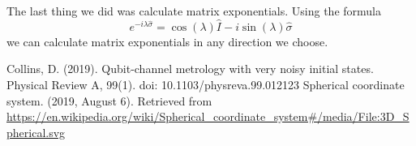 \documentclass[twocolumn]{article}
\begin{document}
The last thing we did was calculate matrix exponentials. Using the formula
\begin{equation}
e^{-i\lambda\hat{\sigma}}=\cos{(\lambda)}\hat{I}-i\sin{(\lambda)}\hat{\sigma}
\end{equation}
we can calculate matrix exponentials in any direction we choose.
\newpage
\begin{thebibliography}{99}
Collins, D. (2019). Qubit-channel metrology with very noisy initial states. Physical Review A, 99(1). doi: 10.1103/physreva.99.012123
Spherical coordinate system. (2019, August 6). Retrieved from \url{https://en.wikipedia.org/wiki/Spherical_coordinate_system#/media/File:3D_Spherical.svg}
\end{thebibliography}
\end{document}
